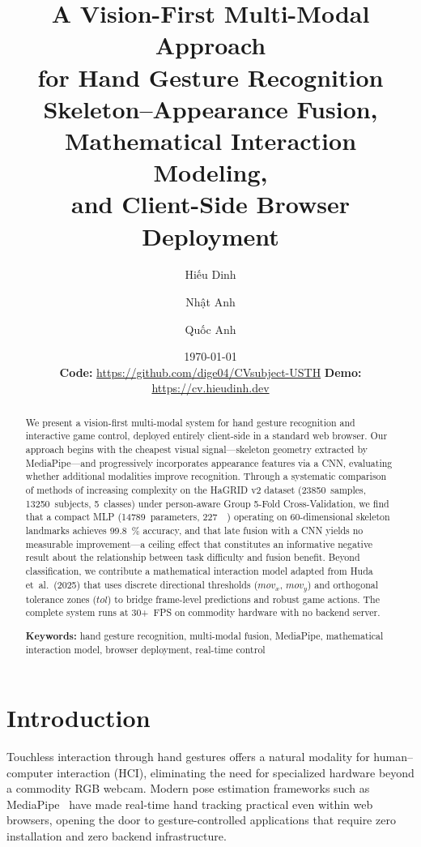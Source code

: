 \documentclass[11pt,a4paper]{article}
\title{\textbf{A Vision-First Multi-Modal Approach\\for Hand Gesture Recognition}\\[0.5em]
\large Skeleton--Appearance Fusion, Mathematical Interaction Modeling,\\and Client-Side Browser Deployment}
\author[1]{Hiếu Dinh}
\author[1]{Nhật Anh}
\author[1]{Quốc Anh}
\affil[1]{Computer Vision Course, Department of Computer Science}
\date{\today\\[0.5em]
{\small \textbf{Code:} \url{https://github.com/dige04/CVsubject-USTH} \quad \textbf{Demo:} \url{https://cv.hieudinh.dev}}}
\begin{document}
\maketitle

\begin{abstract}
\noindent
We present a vision-first multi-modal system for hand gesture recognition and interactive game control, deployed entirely client-side in a standard web browser. Our approach begins with the cheapest visual signal---skeleton geometry extracted by MediaPipe---and progressively incorporates appearance features via a CNN, evaluating whether additional modalities improve recognition. Through a systematic comparison of methods of increasing complexity on the HaGRID v2 dataset (\num{23850}~samples, \num{13250}~subjects, 5~classes) under person-aware Group 5-Fold Cross-Validation, we find that a compact MLP (\num{14789}~parameters, \SI{227}{\kilo\byte}) operating on 60-dimensional skeleton landmarks achieves \SI{99.8}{\percent} accuracy, and that late fusion with a CNN yields no measurable improvement---a ceiling effect that constitutes an informative negative result about the relationship between task difficulty and fusion benefit. Beyond classification, we contribute a mathematical interaction model adapted from Huda et~al.~(2025) that uses discrete directional thresholds ($mov_x$, $mov_y$) and orthogonal tolerance zones ($tol$) to bridge frame-level predictions and robust game actions. The complete system runs at 30+~FPS on commodity hardware with no backend server.

\vspace{0.5em}
\noindent
\textbf{Keywords:} hand gesture recognition, multi-modal fusion, MediaPipe, mathematical interaction model, browser deployment, real-time control
\end{abstract}

\section{Introduction}
\label{sec:intro}

Touchless interaction through hand gestures offers a natural modality for human--computer interaction (HCI), eliminating the need for specialized hardware beyond a commodity RGB webcam. Modern pose estimation frameworks such as MediaPipe~\citep{mediapipe2019,mediapipehands2020} have made real-time hand tracking practical even within web browsers, opening the door to gesture-controlled applications that require zero installation and zero backend infrastructure.
\end{document}
